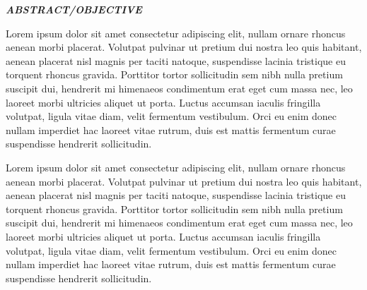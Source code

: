\begin{center}
    {\Large \textbf \emph{ABSTRACT/OBJECTIVE}}
\end{center}

\vspace{10pt}

\begin{spacing}{1.5}
    Lorem ipsum dolor sit amet consectetur adipiscing elit, nullam ornare rhoncus aenean morbi placerat. Volutpat pulvinar ut pretium dui nostra leo quis habitant, aenean placerat nisl magnis per taciti natoque, suspendisse lacinia tristique eu torquent rhoncus gravida. Porttitor tortor sollicitudin sem nibh nulla pretium suscipit dui, hendrerit mi himenaeos condimentum erat eget cum massa nec, leo laoreet morbi ultricies aliquet ut porta. Luctus accumsan iaculis fringilla volutpat, ligula vitae diam, velit fermentum vestibulum. Orci eu enim donec nullam imperdiet hac laoreet vitae rutrum, duis est mattis fermentum curae suspendisse hendrerit sollicitudin.

    Lorem ipsum dolor sit amet consectetur adipiscing elit, nullam ornare rhoncus aenean morbi placerat. Volutpat pulvinar ut pretium dui nostra leo quis habitant, aenean placerat nisl magnis per taciti natoque, suspendisse lacinia tristique eu torquent rhoncus gravida. Porttitor tortor sollicitudin sem nibh nulla pretium suscipit dui, hendrerit mi himenaeos condimentum erat eget cum massa nec, leo laoreet morbi ultricies aliquet ut porta. Luctus accumsan iaculis fringilla volutpat, ligula vitae diam, velit fermentum vestibulum. Orci eu enim donec nullam imperdiet hac laoreet vitae rutrum, duis est mattis fermentum curae suspendisse hendrerit sollicitudin.
\end{spacing}


